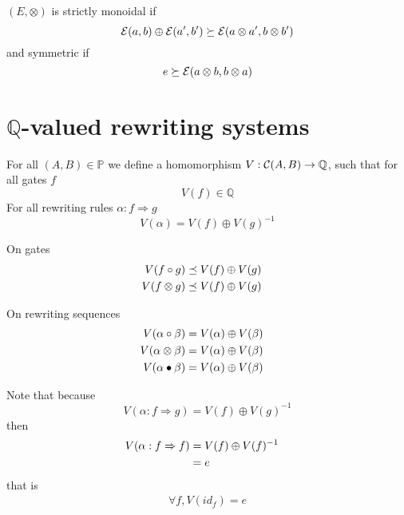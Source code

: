 \documentclass[a4paper]{article}
\begin{document}
\begin{definition}
$(E, \otimes)$ is strictly monoidal if
\[
{\cal E}(a, b) \oplus {\cal E}(a', b') \succeq {\cal E}(a \otimes a', b \otimes b')
\]
and symmetric if
\[
e \succeq {\cal E}(a \otimes b, b \otimes a)
\]
\end{definition}



\section{$\mathbb{Q}$-valued rewriting systems}

\begin{definition}
For all $(A, B) \in \mathbb{P}$ we define a homomorphism $V: {\cal C}(A, B) \to
  \mathbb{Q}$, such that for all gates $f$
\[
V(f) \in \mathbb{Q}
\]
For all rewriting rules $\alpha: f \Rightarrow g$
\[
V(\alpha) = V(f) \oplus V(g)^{-1}
\]

On gates
\begin{align}
V(f \circ g) &\preceq V(f) \oplus V(g) \cr
V(f \otimes g) &\preceq V(f) \oplus V(g)
\end{align}

On rewriting sequences
\begin{align}
V(\alpha \circ \beta) &= V(\alpha) \oplus V(\beta) \cr
V(\alpha \otimes \beta) &= V(\alpha) \oplus V(\beta) \cr
V(\alpha \bullet \beta) &= V(\alpha) \oplus V(\beta)
\end{align}
\end{definition}

\begin{remark}
Note that because
\[
V(\alpha: f \Rightarrow g) = V(f) \oplus V(g)^{-1}
\]
then
\begin{align}
V(\alpha: f \Rightarrow f) &= V(f) \oplus V(f)^{-1} \cr
&= e
\end{align}
that is
\begin{align}
\forall f, V(id_f) = e
\end{align}
\end{remark}
\end{document}
